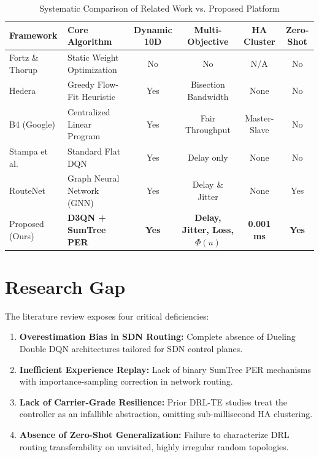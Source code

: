 \documentclass[12pt,a4paper,oneside]{report}
\begin{document}
\begin{table}[htbp]
\centering
\caption{Systematic Comparison of Related Work vs. Proposed Platform}
\label{tab:related_work}
\scriptsize
\begin{tabularx}{\textwidth}{l X c c c c}
\toprule
\textbf{Framework} & \textbf{Core Algorithm} & \textbf{Dynamic 10D} & \textbf{Multi-Objective} & \textbf{HA Cluster} & \textbf{Zero-Shot} \\
\midrule
Fortz \& Thorup & Static Weight Optimization & No & No & N/A & No \\
Hedera & Greedy Flow-Fit Heuristic & Yes & Bisection Bandwidth & None & No \\
B4 (Google) & Centralized Linear Program & Yes & Fair Throughput & Master-Slave & No \\
Stampa et al. & Standard Flat DQN & Yes & Delay only & None & No \\
RouteNet & Graph Neural Network (GNN) & Yes & Delay \& Jitter & None & Yes \\
Proposed (Ours) & \textbf{D3QN + SumTree PER} & \textbf{Yes} & \textbf{Delay, Jitter, Loss, $\Phi(u)$} & \textbf{0.001 ms} & \textbf{Yes} \\
\bottomrule
\end{tabularx}
\end{table}

\section{Research Gap}
The literature review exposes four critical deficiencies:
\begin{enumerate}
    \item \textbf{Overestimation Bias in SDN Routing:} Complete absence of Dueling Double DQN architectures tailored for SDN control planes.
    \item \textbf{Inefficient Experience Replay:} Lack of binary SumTree PER mechanisms with importance-sampling correction in network routing.
    \item \textbf{Lack of Carrier-Grade Resilience:} Prior DRL-TE studies treat the controller as an infallible abstraction, omitting sub-millisecond HA clustering.
    \item \textbf{Absence of Zero-Shot Generalization:} Failure to characterize DRL routing transferability on unvisited, highly irregular random topologies.
\end{enumerate}

\clearpage

\end{document}
